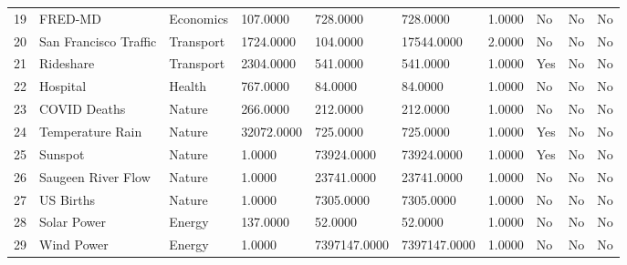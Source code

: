 \begin{tabular}{llllllllll}
19 & FRED-MD & Economics & 107.0000 & 728.0000 & 728.0000 & 1.0000 & No & No & No \\
20 & San Francisco Traffic & Transport & 1724.0000 & 104.0000 & 17544.0000 & 2.0000 & No & No & No \\
21 & Rideshare & Transport & 2304.0000 & 541.0000 & 541.0000 & 1.0000 & Yes & No & No \\
22 & Hospital & Health & 767.0000 & 84.0000 & 84.0000 & 1.0000 & No & No & No \\
23 & COVID Deaths & Nature & 266.0000 & 212.0000 & 212.0000 & 1.0000 & No & No & No \\
24 & Temperature Rain & Nature & 32072.0000 & 725.0000 & 725.0000 & 1.0000 & Yes & No & No \\
25 & Sunspot & Nature & 1.0000 & 73924.0000 & 73924.0000 & 1.0000 & Yes & No & No \\
26 & Saugeen River Flow & Nature & 1.0000 & 23741.0000 & 23741.0000 & 1.0000 & No & No & No \\
27 & US Births & Nature & 1.0000 & 7305.0000 & 7305.0000 & 1.0000 & No & No & No \\
28 & Solar Power & Energy & 137.0000 & 52.0000 & 52.0000 & 1.0000 & No & No & No \\
29 & Wind Power & Energy & 1.0000 & 7397147.0000 & 7397147.0000 & 1.0000 & No & No & No \\
\bottomrule
\end{tabular}
